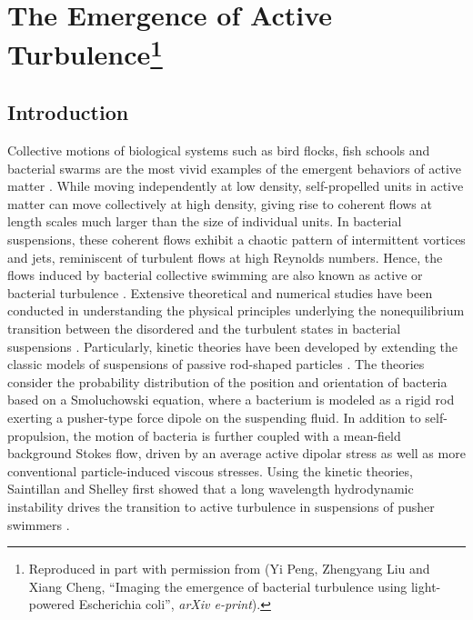 \chapter[The Emergence of Active Turbulence]{The Emergence of Active Turbulence\footnote[1]{
Reproduced in part with permission from (Yi Peng, Zhengyang Liu and Xiang Cheng, ``Imaging the emergence of bacterial turbulence using light-powered Escherichia coli'', \textit{arXiv e-print}).
}}
\label{the-emergence-of-active-turbulence}

\section{Introduction}
Collective motions of biological systems such as bird flocks, fish schools and bacterial swarms are the most vivid examples of the emergent behaviors of active matter \cite{Marchetti2013}. While moving independently at low density, self-propelled units in active matter can move collectively at high density, giving rise to coherent flows at length scales much larger than the size of individual units. In bacterial suspensions, these coherent flows exhibit a chaotic pattern of intermittent vortices and jets, reminiscent of turbulent flows at high Reynolds numbers. Hence, the flows induced by bacterial collective swimming are also known as active or bacterial turbulence \cite{Wolgemuth2008, Wensink2012, Linkmann2019, Dunkel2013a}.
Extensive theoretical and numerical studies have been conducted in understanding the physical principles underlying the nonequilibrium transition between the disordered and the turbulent states in bacterial suspensions \cite{Marchetti2013, Ramaswamy2010, Koch2011, Saintillan2015}.
Particularly, kinetic theories have been developed by extending the classic models of suspensions of passive rod-shaped particles \cite{Koch2011, Saintillan2015, Stenhammar2017}. The theories consider the probability distribution of the position and orientation of bacteria based on a Smoluchowski equation, where a bacterium is modeled as a rigid rod exerting a pusher-type force dipole on the suspending fluid. In addition to self-propulsion, the motion of bacteria is further coupled with a mean-field background Stokes flow, driven by an average active dipolar stress as well as more conventional particle-induced viscous stresses.
Using the kinetic theories, Saintillan and Shelley first showed that a long wavelength hydrodynamic instability drives the transition to active turbulence in suspensions of pusher swimmers \cite{Saintillan2015, Saintillan2008a, Saintillan2008b, Hohenegger2010}.
